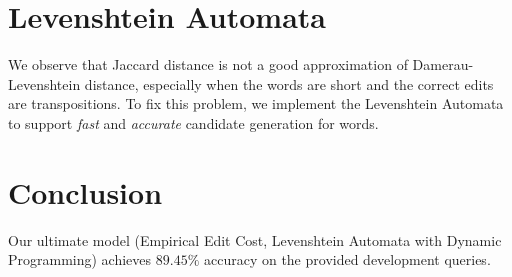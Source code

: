 \section{Levenshtein Automata}
We observe that Jaccard distance is not a good approximation of Damerau-Levenshtein distance, especially when the words are short and the correct edits are transpositions. To fix this problem, we implement the Levenshtein Automata to support \emph{fast} and \emph{accurate} candidate generation for words.

\section{Conclusion}
Our ultimate model (Empirical Edit Cost, Levenshtein Automata with Dynamic Programming) achieves $89.45\%$ accuracy on the provided development queries.




